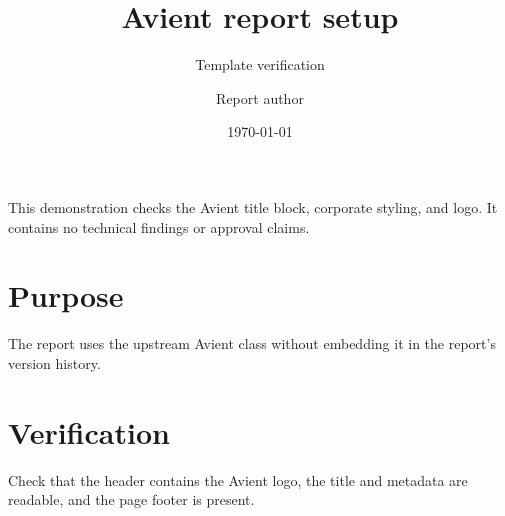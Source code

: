\documentclass{avient}
\title{Avient report setup}
\subtitle{Template verification}
\author{Report author}
\date{\today}
\begin{document}
\maketitle

\begin{executivesummary}
This demonstration checks the Avient title block, corporate styling, and logo.
It contains no technical findings or approval claims.
\end{executivesummary}

\section{Purpose}
The report uses the upstream Avient class without embedding it in the report's
version history.

\section{Verification}
Check that the header contains the Avient logo, the title and metadata are
readable, and the page footer is present.
\end{document}
